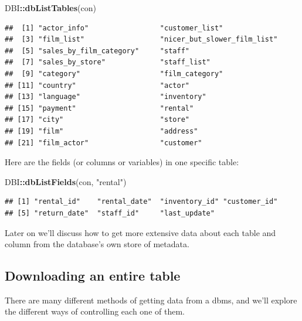 \documentclass[]{book}
\newenvironment{Shaded}{\begin{snugshade}}{\end{snugshade}}
\newcommand{\KeywordTok}[1]{\textcolor[rgb]{0.13,0.29,0.53}{\textbf{#1}}}
\newcommand{\NormalTok}[1]{#1}
\newcommand{\OperatorTok}[1]{\textcolor[rgb]{0.81,0.36,0.00}{\textbf{#1}}}
\newcommand{\StringTok}[1]{\textcolor[rgb]{0.31,0.60,0.02}{#1}}
\theoremstyle{definition}
\theoremstyle{definition}
\theoremstyle{definition}
\theoremstyle{remark}
\begin{document}
\begin{Shaded}
\begin{Highlighting}[]
\NormalTok{DBI}\OperatorTok{::}\KeywordTok{dbListTables}\NormalTok{(con)}
\end{Highlighting}
\end{Shaded}

\begin{verbatim}
##  [1] "actor_info"                 "customer_list"             
##  [3] "film_list"                  "nicer_but_slower_film_list"
##  [5] "sales_by_film_category"     "staff"                     
##  [7] "sales_by_store"             "staff_list"                
##  [9] "category"                   "film_category"             
## [11] "country"                    "actor"                     
## [13] "language"                   "inventory"                 
## [15] "payment"                    "rental"                    
## [17] "city"                       "store"                     
## [19] "film"                       "address"                   
## [21] "film_actor"                 "customer"
\end{verbatim}

Here are the fields (or columns or variables) in one specific table:

\begin{Shaded}
\begin{Highlighting}[]
\NormalTok{DBI}\OperatorTok{::}\KeywordTok{dbListFields}\NormalTok{(con, }\StringTok{"rental"}\NormalTok{)}
\end{Highlighting}
\end{Shaded}

\begin{verbatim}
## [1] "rental_id"    "rental_date"  "inventory_id" "customer_id" 
## [5] "return_date"  "staff_id"     "last_update"
\end{verbatim}

Later on we'll discuss how to get more extensive data about each table
and column from the database's own store of metadata.

\hypertarget{downloading-an-entire-table}{%
\subsection{Downloading an entire
table}\label{downloading-an-entire-table}}

There are many different methods of getting data from a dbms, and we'll
explore the different ways of controlling each one of them.
\end{document}
